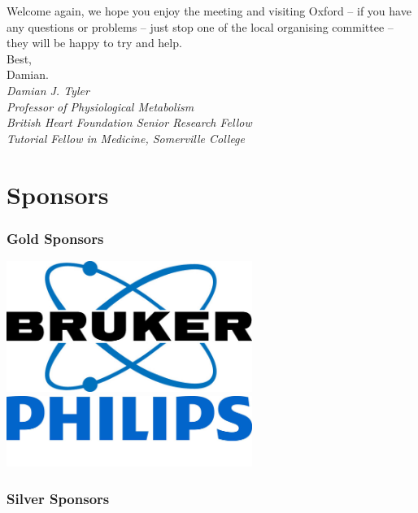 \documentclass[a5paper,10pt,twoside,onecolumn,openany,helvetica,showtrims]{memoir}
\begin{document}
Welcome again, we hope you enjoy the meeting and visiting Oxford -- if you have any questions or problems – just stop one of the local organising committee -- they will be happy to try and help.\\

 
Best,\\[2em]
 

Damian.\\[3em]
\emph{\hfill Damian J. Tyler}\\
\emph{Professor of Physiological Metabolism}\\
\emph{British Heart Foundation Senior Research Fellow}\\
\emph{Tutorial Fellow in Medicine, Somerville College}
\chapter{Sponsors}
\subsection{Gold Sponsors}
\begin{center}
\vfill
\includegraphics[width=0.6\textwidth]{Sponsors/converted/bruker_logo}\\
		\vfill
		\includegraphics[width=0.6\textwidth]{Sponsors/converted/philips_logo}
	\vfill
\end{center}






\subsection{Silver Sponsors}
\end{document}
